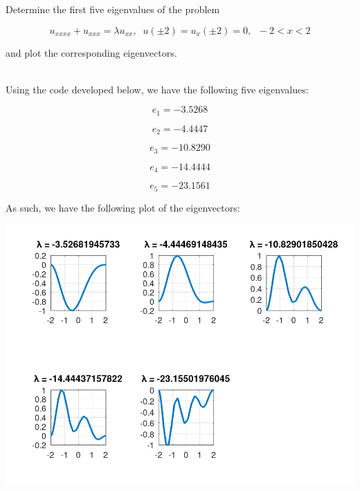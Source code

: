 Determine the first five eigenvalues of the problem

$$u_{xxxx}+u_{xxx}=\lambda u_{xx},\;\; u(\pm2)=u_x(\pm2)=0,\;\; -2<x<2$$

and plot the corresponding eigenvectors.\\

\begin{solution}\renewcommand{\qedsymbol}{}\ \\
    Using the code developed below, we have the following five eigenvalues:

    $$e_1=-3.5268$$

    $$e_2=-4.4447$$

    $$e_3=-10.8290$$

    $$e_4=-14.4444$$

    $$e_5=-23.1561$$

    As such, we have the following plot of the eigenvectors:

    \begin{center}
        \includegraphics[scale=0.4]{problem14_1_evects.PNG}
    \end{center}

\end{solution}

\newpage

\newpage